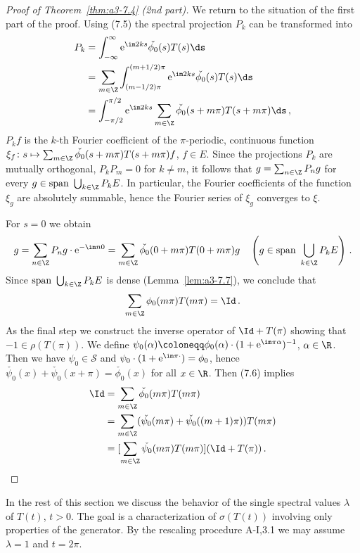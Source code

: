 \begin{proof}[Proof of Theorem~\ref{thm:a3-7.4} (2nd part)]
We return to the situation of the first part of the proof.
Using (7.5) the spectral projection $P_{k}$ can be transformed into
\begin{align*}
P_{k} &= \int_{-\infty}^{\infty} \mathrm{e}^{\im 2ks}\check{\phi_{0}}(s)T(s)\ds \\
&= \sum_{m\in\Z} \int_{(m-1/2)\pi}^{(m+1/2)\pi} \mathrm{e}^{\im 2ks}\check{\phi_{0}}(s)T(s)\ds \\
&= \int_{-\pi/2}^{\pi/2} \mathrm{e}^{\im 2ks}\sum_{m\in\Z}\check{\phi_{0}}(s+m\pi)T(s+m\pi)\ds\,,
\end{align*}
\ie $P_{k}f$ is the $k$-th Fourier coefficient of the $\pi$-periodic, continuous function $\xi_{f} \colon s \mapsto \sum_{m\in\Z} \check{\phi_{0}}(s+m\pi)T(s+m\pi)f$, $f \in E$.
Since the projections $P_{k}$ are mutually orthogonal, \ie $P_{k}P_{m} = 0$ for $k \neq m$, it follows that $g = \sum_{n\in\Z} P_{n}g$ for every $g \in \text{span }\bigcup_{k\in\Z} P_{k}E$.
In particular, the Fourier coefficients of the function $\xi_{g}$ are absolutely summable, hence the Fourier series of $\xi_{g}$ converges to $\xi$.

For $s = 0$ we obtain
\[
g = \sum_{n\in\Z} P_{n}g\cdot \mathrm{e}^{-\im n0} = \sum_{m\in\Z} \check{\phi_{0}}(0 + m\pi)T(0 + m\pi)g \quad 
\left(g \in \text{span }\bigcup_{k\in\Z} P_{k}E\right)\,.
\]
Since $\text{span }\bigcup_{k\in\Z} P_{k}E$ is dense (Lemma~\ref{lem:a3-7.7}), we conclude that
\begin{equation}\label{eq:a3-7.6}
\sum_{m\in\Z} \phi_{0}(m\pi)T(m\pi) = \Id\,.
\end{equation}
As the final step we construct the inverse operator of $\Id + T(\pi)$ showing that $-1 \in \rho(T(\pi))$.
We define $\psi_{0}(\alpha) \coloneqq \phi_{0}(\alpha)\cdot(1 + \mathrm{e}^{\im\pi\alpha})^{-1}$, $\alpha \in \R$.
Then we have $\psi_{0} \in \mathcal{S}$ and $\psi_{0}\cdot(1 + \mathrm{e}^{\im\pi\cdot}) = \phi_{0}$,
hence $\check{\psi_{0}}(x) + \check{\psi_{0}}(x + \pi) = \check{\phi_{0}}(x)$ for all $x \in \R$.
Then (7.6) implies
\begin{align*}
\Id &= \sum_{m\in\Z} \check{\phi_{0}}(m\pi)T(m\pi) \\
&= \sum_{m\in\Z} (\check{\psi_{0}}(m\pi) + \check{\psi_{0}}((m+1)\pi))T(m\pi) \\
&= [\sum_{m\in\Z} \check{\psi_{0}}(m\pi)T(m\pi)](\Id + T(\pi))\,.
\end{align*}
\end{proof}
In the rest of this section we discuss the behavior of the single spectral values $\lambda$ of $T(t)$, $t > 0$.
The goal is a characterization of $\sigma(T(t))$ involving only properties of the generator.
By the rescaling procedure A-I,3.1 we may assume $\lambda = 1$ and $t = 2\pi$.

